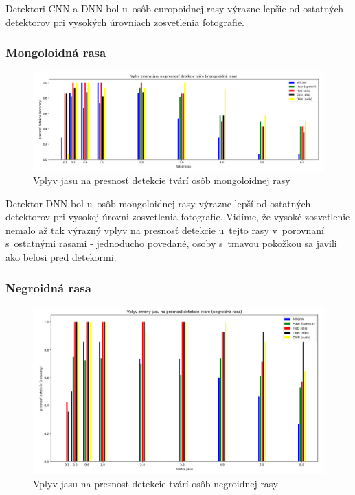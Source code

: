 \documentclass[]{article}
\begin{document}
	Detektori CNN a DNN bol u~osôb europoidnej rasy výrazne lepšie od ostatných detektorov pri vysokých úrovniach zosvetlenia fotografie.

	\subsubsection*{Mongoloidná rasa}
	\begin{figure}[h!]
		\includegraphics[width=\textwidth]{Vysledky_jas/mongo/Figure_1.png}
		\caption{Vplyv jasu na presnosť detekcie tvárí osôb mongoloidnej rasy}
	\end{figure}

	Detektor DNN bol u~osôb mongoloidnej rasy výrazne lepší od ostatných detektorov pri vysokej úrovni zosvetlenia fotografie. Vidíme, že vysoké zosvetlenie nemalo až tak výrazný vplyv na presnosť detekcie u~tejto rasy v~porovnaní s~ostatnými rasami \-- jednoducho povedané, osoby s~tmavou pokožkou sa javili ako belosi pred detekormi.

	\newpage

	\subsubsection*{Negroidná rasa}
	\begin{figure}[h!]
		\includegraphics[width=\textwidth]{Vysledky_jas/negro/Figure_1.png}
		\caption{Vplyv jasu na presnosť detekcie tvárí osôb negroidnej rasy}
	\end{figure}
\end{document}
